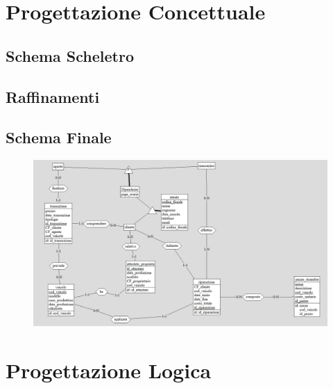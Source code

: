 \documentclass[a4paper,12pt]{report}
\begin{document}
\chapter{Progettazione Concettuale}

\section{Schema Scheletro}

\section{Raffinamenti}

\section{Schema Finale}
	\begin{figure}[h!]
		\centering
		\includegraphics[scale=0.56]{img/schema_finale.png}
	\end{figure}

\chapter{Progettazione Logica}
\end{document}
